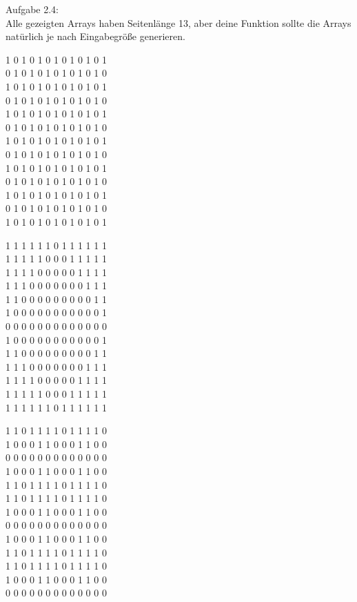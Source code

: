 \documentclass{../../sheet}
\begin{document}
\newpage
{}
\hypertarget{Aufgabe_4}{}
Aufgabe 2.4:\\
Alle gezeigten Arrays haben Seitenlänge 13, aber deine Funktion sollte die Arrays natürlich je nach Eingabegröße generieren.
\begin{ausgabe}
    1 0 1 0 1 0 1 0 1 0 1 0 1 \\
    0 1 0 1 0 1 0 1 0 1 0 1 0 \\
    1 0 1 0 1 0 1 0 1 0 1 0 1 \\
    0 1 0 1 0 1 0 1 0 1 0 1 0 \\
    1 0 1 0 1 0 1 0 1 0 1 0 1 \\
    0 1 0 1 0 1 0 1 0 1 0 1 0 \\
    1 0 1 0 1 0 1 0 1 0 1 0 1 \\
    0 1 0 1 0 1 0 1 0 1 0 1 0 \\
    1 0 1 0 1 0 1 0 1 0 1 0 1 \\
    0 1 0 1 0 1 0 1 0 1 0 1 0 \\
    1 0 1 0 1 0 1 0 1 0 1 0 1 \\
    0 1 0 1 0 1 0 1 0 1 0 1 0 \\
    1 0 1 0 1 0 1 0 1 0 1 0 1
\end{ausgabe}
\begin{ausgabe}
    1 1 1 1 1 1 0 1 1 1 1 1 1 \\
    1 1 1 1 1 0 0 0 1 1 1 1 1 \\
    1 1 1 1 0 0 0 0 0 1 1 1 1 \\
    1 1 1 0 0 0 0 0 0 0 1 1 1 \\
    1 1 0 0 0 0 0 0 0 0 0 1 1 \\
    1 0 0 0 0 0 0 0 0 0 0 0 1 \\
    0 0 0 0 0 0 0 0 0 0 0 0 0 \\
    1 0 0 0 0 0 0 0 0 0 0 0 1 \\
    1 1 0 0 0 0 0 0 0 0 0 1 1 \\
    1 1 1 0 0 0 0 0 0 0 1 1 1 \\
    1 1 1 1 0 0 0 0 0 1 1 1 1 \\
    1 1 1 1 1 0 0 0 1 1 1 1 1 \\
    1 1 1 1 1 1 0 1 1 1 1 1 1
\end{ausgabe}
\begin{ausgabe}
    1 1 0 1 1 1 1 0 1 1 1 1 0 \\
    1 0 0 0 1 1 0 0 0 1 1 0 0 \\
    0 0 0 0 0 0 0 0 0 0 0 0 0 \\
    1 0 0 0 1 1 0 0 0 1 1 0 0 \\
    1 1 0 1 1 1 1 0 1 1 1 1 0 \\
    1 1 0 1 1 1 1 0 1 1 1 1 0 \\
    1 0 0 0 1 1 0 0 0 1 1 0 0 \\
    0 0 0 0 0 0 0 0 0 0 0 0 0 \\
    1 0 0 0 1 1 0 0 0 1 1 0 0 \\
    1 1 0 1 1 1 1 0 1 1 1 1 0 \\
    1 1 0 1 1 1 1 0 1 1 1 1 0 \\
    1 0 0 0 1 1 0 0 0 1 1 0 0 \\
    0 0 0 0 0 0 0 0 0 0 0 0 0
\end{ausgabe}
\end{document}
